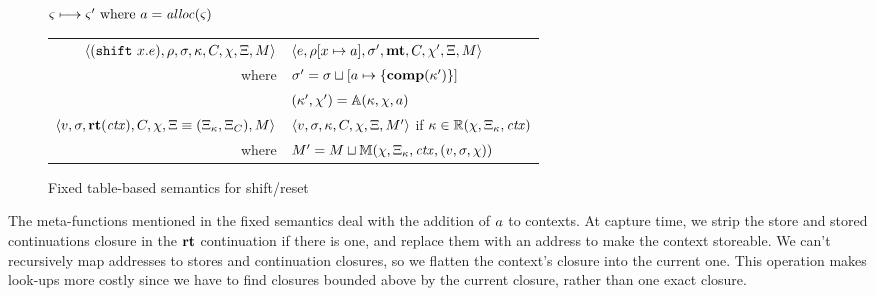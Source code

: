 \begin{figure}
  \centering
  $\varsigma \longmapsto \varsigma' \text{ where } a = \mathit{alloc}(\varsigma)$ \\
  \begin{tabular}{r|l}
    \hline
    $\langle (\texttt{shift}\ x. e), \rho, \sigma, \kappa, C, \chi, \Xi, M \rangle$
    &
    $\langle e, \rho[x \mapsto a], \sigma',\mathbf{mt},C, \chi', \Xi,M \rangle$
    \\
    where & $\sigma' = \sigma\sqcup[a \mapsto \{ \mathbf{comp}(\kappa') \}]$ \\
    & $(\kappa',\chi') = {\mathbb A}(\kappa, \chi, a)$
\\
   $\langle v, \sigma, \mathbf{rt}(\mathit{ctx}), C, \chi, \Xi\equiv(\Xi_\kappa,\Xi_C), M \rangle$
   &
   $\langle v, \sigma, \kappa, C, \chi, \Xi, M' \rangle$
   if $\kappa \in {\mathbb R}(\chi, \Xi_\kappa, \mathit{ctx})$
   \\
   where & $M' = M \sqcup {\mathbb M}(\chi, \Xi_\kappa, \mathit{ctx}, (v, \sigma, \chi))$
  \end{tabular}
  \caption{Fixed table-based semantics for shift/reset}
  \label{fig:shift-reset-table1}
\end{figure}

The meta-functions mentioned in the fixed semantics deal with the addition of $a$ to contexts.
%
At capture time, we strip the store and stored continuations closure in the $\mathbf{rt}$ continuation if there is one, and replace them with an address to make the context storeable.
%
We can't recursively map addresses to stores and continuation closures, so we flatten the context's closure into the current one.
%
This operation makes look-ups more costly since we have to find closures bounded above by the current closure, rather than one exact closure.

